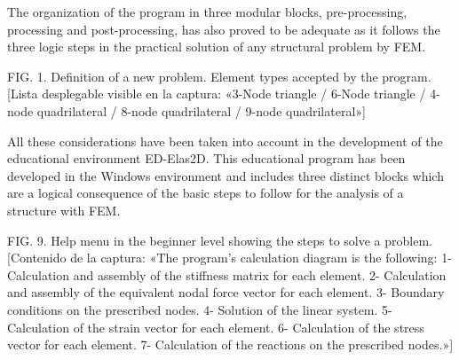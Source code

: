 \documentclass[11pt,a4paper]{article}
\newcommand{\campo}[1]{\textcolor{gris}{\footnotesize #1}}
\begin{document}
\vspace{3pt}\noindent{\small\textbf{p.\ 253} \quad \campo{ED-Elas2D comparte «la organización en pre-proceso, proceso y post-proceso» (02\_marco\_teorico.tex:13) y la tabla comparativa le asigna «Media (pre/proc/post)» (02\_marco\_teorico.tex:28)}}\par
\begin{pasaje}\footnotesize The organization of the program in three modular blocks, pre-processing, processing and post-processing, has also proved to be adequate as it follows the three logic steps in the practical solution of any structural problem by FEM.\end{pasaje}
\vspace{3pt}\noindent{\small\textbf{p.\ 244} \quad \campo{«una biblioteca de elementos triangulares y cuadriláteros que incluye los elementos Q4, Q8 y Q9» (02\_marco\_teorico.tex:13) y la celda de tabla «Triángulos y cuadriláteros (Q4/Q8/Q9)» (02\_marco\_teorico.tex:28)}}\par
\begin{pasaje}\footnotesize FIG. 1. Definition of a new problem. Element types accepted by the program. [Lista desplegable visible en la captura: «3-Node triangle / 6-Node triangle / 4-node quadrilateral / 8-node quadrilateral / 9-node quadrilateral»]\end{pasaje}
\vspace{3pt}\noindent{\small\textbf{p.\ 247} \quad \campo{«aquel programa de finales de la década de 1990 [...] ligado a la plataforma y a las posibilidades de su época» (02\_marco\_teorico.tex:13)}}\par
\begin{pasaje}\footnotesize All these considerations have been taken into account in the development of the educational environment ED-Elas2D. This educational program has been developed in the Windows environment and includes three distinct blocks which are a logical consequence of the basic steps to follow for the analysis of a structure with FEM.\end{pasaje}
\vspace{3pt}\noindent{\small\textbf{p.\ 248} \quad \campo{Columna «Canal completo: Sí» para ED-Elas2D, entendido como recorrer mapeo isoparamétrico, Jacobiano, B, constitutiva, rigidez, ensamblaje y recuperación de tensiones (02\_marco\_teorico.tex:28)}}\par
\begin{pasaje}\footnotesize FIG. 9. Help menu in the beginner level showing the steps to solve a problem. [Contenido de la captura: «The program's calculation diagram is the following: 1- Calculation and assembly of the stiffness matrix for each element. 2- Calculation and assembly of the equivalent nodal force vector for each element. 3- Boundary conditions on the prescribed nodes. 4- Solution of the linear system. 5- Calculation of the strain vector for each element. 6- Calculation of the stress vector for each element. 7- Calculation of the reactions on the prescribed nodes.»]\end{pasaje}
\end{document}
